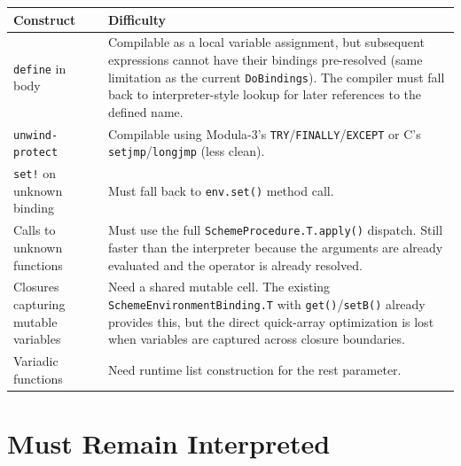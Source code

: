 \documentclass[12pt]{report}
\begin{document}
\begin{center}
\begin{longtable}{lp{9cm}}
\toprule
\textbf{Construct} & \textbf{Difficulty} \\
\midrule
\endhead
\texttt{define} in body &
  Compilable as a local variable assignment, but subsequent
  expressions cannot have their bindings pre-resolved (same
  limitation as the current \texttt{DoBindings}).  The compiler
  must fall back to interpreter-style lookup for later references
  to the defined name. \\
\texttt{unwind-protect} &
  Compilable using Modula-3's \texttt{TRY}/\texttt{FINALLY}/\texttt{EXCEPT}
  or C's \texttt{setjmp}/\texttt{longjmp} (less clean). \\
\texttt{set!} on unknown binding &
  Must fall back to \texttt{env.set()} method call. \\
Calls to unknown functions &
  Must use the full \texttt{SchemeProcedure.T.apply()} dispatch.
  Still faster than the interpreter because the arguments are
  already evaluated and the operator is already resolved. \\
Closures capturing mutable variables &
  Need a shared mutable cell.  The existing
  \texttt{SchemeEnvironmentBinding.T} with \texttt{get()}/\texttt{setB()}
  already provides this, but the direct quick-array optimization
  is lost when variables are captured across closure boundaries. \\
Variadic functions &
  Need runtime list construction for the rest parameter. \\
\bottomrule
\end{longtable}
\end{center}

\section{Must Remain Interpreted}
\end{document}
